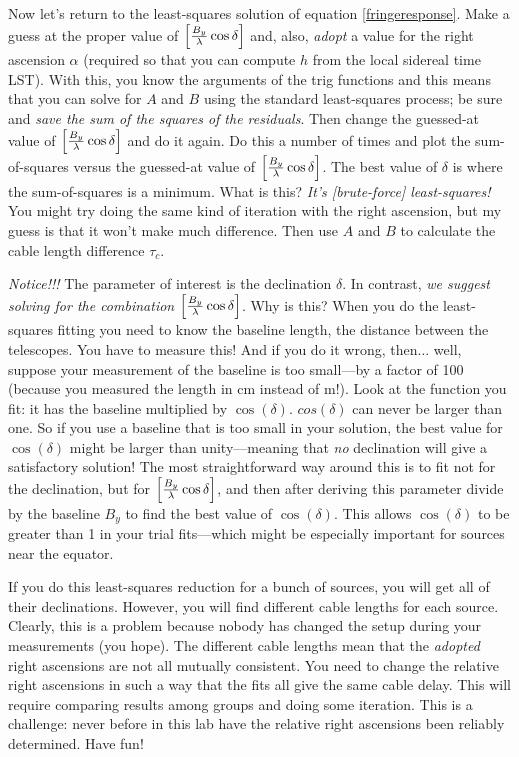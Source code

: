 \documentclass[11pt,preprint]{aastex}
\begin{document}
	Now let's return to the least-squares solution of equation
\ref{fringeresponse}. Make a guess at the proper value of $\left[{B_y
\over \lambda }\cos \delta \right]$ and, also, {\it adopt} a value for
the right ascension $\alpha$ (required so that you can compute $h$ from
the local sidereal time LST).  With this, you know the arguments of the
trig functions and this means that you can solve for $A$ and $B$ using
the standard least-squares process; be sure and {\it save the sum of the
squares of the residuals}.  Then change the guessed-at value of
$\left[{B_y \over \lambda}\cos \delta \right]$ and do it again.  Do this
a number of times and plot the sum-of-squares versus the guessed-at
value of $\left[{B_y \over \lambda}\cos \delta \right]$.  The best value
of $\delta$ is where the sum-of-squares is a minimum.  What is this?
{\it It's [brute-force] least-squares!} You might try doing the same
kind of iteration with the right ascension, but my guess is that it
won't make much difference.  Then use $A$ and $B$ to calculate the cable
length difference $\tau_c$. 

	{\it Notice!!!} The parameter of interest is the declination
$\delta$.  In contrast, {\it we suggest solving for the combination
$\left[{B_y \over \lambda}\cos \delta \right]$}. Why is this? When you do
the least-squares fitting you need to know the baseline length, the
distance between the telescopes.  You have to measure this! And if you
do it wrong, then... well, suppose your measurement of the baseline is
too small---by a factor of 100 (because you measured the length in cm
instead of m!).  Look at the function you fit: it has the baseline
multiplied by $\cos(\delta)$.  $cos(\delta)$ can never be larger than
one.  So if you use a baseline that is too small in your solution, the
best value for $\cos(\delta)$ might be larger than unity---meaning that {\it
no} declination will give a satisfactory solution! The most
straightforward way around this is to fit not for the declination, but
for $\left[{B_y \over \lambda}\cos \delta \right]$, and then after
deriving this parameter divide by the baseline $B_y$ to find the best
value of $\cos(\delta)$.  This allows $\cos(\delta)$ to be greater than 1 in
your trial fits---which might be especially important for sources near
the equator.

	If you do this least-squares reduction for a bunch of sources,
you will get all of their declinations.  However, you will find
different cable lengths for each source.  Clearly, this is a problem
because nobody has changed the setup during your measurements (you
hope).  The different cable lengths mean that the {\it adopted} right
ascensions are not all mutually consistent.  You need to change the
relative right ascensions in such a way that the fits all give the same
cable delay.  This will require comparing results among groups and doing
some iteration.  This is a challenge: never before in this lab have the
relative right ascensions been reliably determined.  Have fun!
\end{document}
